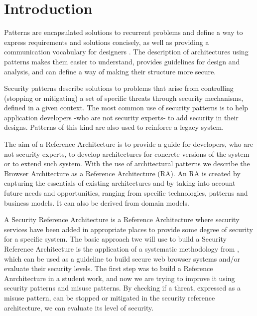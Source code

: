 \documentclass{sig-alternate-05-2015}
\begin{document}





\section*{Introduction}
Patterns are encapsulated solutions to recurrent problems and define a way to express requirements and solutions concisely, as well as providing a communication vocabulary for designers \cite{gamma1994design}. The description of architectures using patterns makes them easier to understand, provides guidelines for design and analysis, and can define a way of making their structure more secure.

Security patterns describe solutions to problems that arise from controlling (stopping or mitigating) a set of specific threats through security mechanisms, defined in a given context. The most common use of security patterns is to help application developers -who are not security experts- to add security in their designs. Patterns of this kind are also used to reinforce a legacy system.

The aim of a Reference Architecture is to provide a guide for developers, who are not security experts, to develop architectures for concrete versions of the system or to extend such system. With the use of architectural patterns we describe the Browser Architecture as a Reference Architecture (RA). An RA is created by capturing the essentials of existing architectures and by taking into account future needs and opportunities, ranging from specific technologies, patterns and business models. It can also be derived from domain models.

A Security Reference Architecture is a Reference Architecture where security services have been added in appropriate places to provide some degree of security for a specific system. The basic approach twe will use to build a Security Reference Architecture is the application of a systematic methodology from \cite{fernandez2006methodology,Fernandez2011,Fernandez2015}, which can be used as a guideline to build secure web browser systems and/or evaluate their security levels. The first step was to build a Reference Anrchitecture in a student work, and now we are trying to improve it using security patterns and misuse patterns. By checking if a threat, expressed as a misuse pattern, can be stopped or mitigated in the security reference architecture, we can evaluate its level of security.
\end{document}
